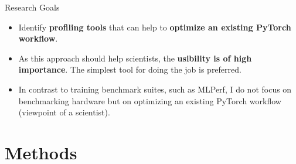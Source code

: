 \documentclass[compress,aspectratio=169]{beamer}
\begin{document}
\begin{frame}{Research Goals}

\begin{itemize}
    \item Identify \textbf{profiling tools} that can help to \textbf{optimize an existing PyTorch workflow}.
    \vspace{1em}
    \item As this approach should help scientists, the \textbf{usibility is of high importance}. The simplest tool for doing the job is preferred.
    \vspace{1em}
    \item In contrast to training benchmark suites, such as MLPerf, I do not focus on benchmarking hardware but on optimizing an existing PyTorch workflow (viewpoint of a scientist).
\end{itemize}

\end{frame}

\section{Methods}
\sectionIntro %
\end{document}
